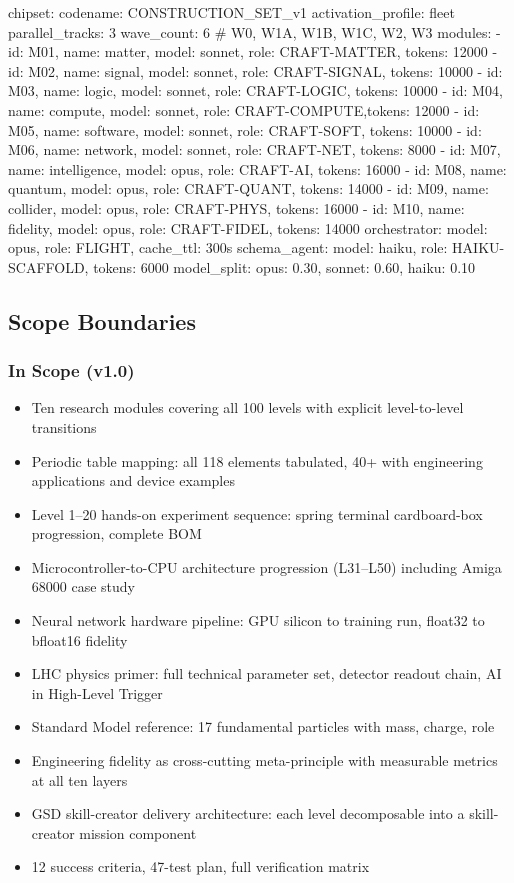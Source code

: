 \documentclass[11pt,letterpaper]{article}
\begin{document}
\begin{asciibox}
chipset:
  codename: CONSTRUCTION_SET_v1
  activation_profile: fleet
  parallel_tracks: 3
  wave_count: 6           # W0, W1A, W1B, W1C, W2, W3
  modules:
    - {id: M01, name: matter,        model: sonnet, role: CRAFT-MATTER, tokens: 12000}
    - {id: M02, name: signal,        model: sonnet, role: CRAFT-SIGNAL, tokens: 10000}
    - {id: M03, name: logic,         model: sonnet, role: CRAFT-LOGIC,  tokens: 10000}
    - {id: M04, name: compute,       model: sonnet, role: CRAFT-COMPUTE,tokens: 12000}
    - {id: M05, name: software,      model: sonnet, role: CRAFT-SOFT,   tokens: 10000}
    - {id: M06, name: network,       model: sonnet, role: CRAFT-NET,    tokens:  8000}
    - {id: M07, name: intelligence,  model: opus,   role: CRAFT-AI,     tokens: 16000}
    - {id: M08, name: quantum,       model: opus,   role: CRAFT-QUANT,  tokens: 14000}
    - {id: M09, name: collider,      model: opus,   role: CRAFT-PHYS,   tokens: 16000}
    - {id: M10, name: fidelity,      model: opus,   role: CRAFT-FIDEL,  tokens: 14000}
  orchestrator: {model: opus, role: FLIGHT, cache_ttl: 300s}
  schema_agent:  {model: haiku, role: HAIKU-SCAFFOLD, tokens: 6000}
  model_split:   {opus: 0.30, sonnet: 0.60, haiku: 0.10}
\end{asciibox}

\subsection{Scope Boundaries}

\subsubsection{In Scope (v1.0)}

\begin{itemize}[leftmargin=*]
  \item Ten research modules covering all 100 levels with explicit level-to-level transitions
  \item Periodic table mapping: all 118 elements tabulated, 40+ with engineering applications and device examples
  \item Level 1--20 hands-on experiment sequence: spring terminal cardboard-box progression, complete BOM
  \item Microcontroller-to-CPU architecture progression (L31--L50) including Amiga 68000 case study
  \item Neural network hardware pipeline: GPU silicon to training run, float32 to bfloat16 fidelity
  \item LHC physics primer: full technical parameter set, detector readout chain, AI in High-Level Trigger
  \item Standard Model reference: 17 fundamental particles with mass, charge, role
  \item Engineering fidelity as cross-cutting meta-principle with measurable metrics at all ten layers
  \item GSD skill-creator delivery architecture: each level decomposable into a skill-creator mission component
  \item 12 success criteria, 47-test plan, full verification matrix
\end{itemize}
\end{document}
